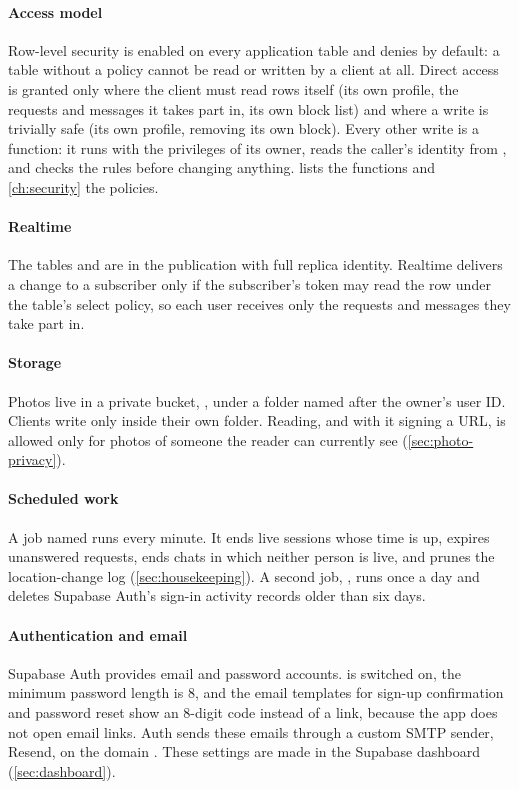 \paragraph{Access model} Row-level security is enabled on every application table and denies by default:
a table without a policy cannot be read or written by a client at all. Direct access is granted only
where the client must read rows itself (its own profile, the requests and messages it takes part in, its
own block list) and where a write is trivially safe (its own profile, removing its own block). Every
other write is a  function: it runs with the privileges of its owner, reads the
caller's identity from , and checks the rules before changing anything. 
lists the functions and \cref{ch:security} the policies.

\paragraph{Realtime} The tables  and  are in the
 publication with full replica identity. Realtime delivers a change to a
subscriber only if the subscriber's token may read the row under the table's select policy, so each user
receives only the requests and messages they take part in.

\paragraph{Storage} Photos live in a private bucket, , under a folder named after the
owner's user ID. Clients write only inside their own folder. Reading, and with it signing a URL, is
allowed only for photos of someone the reader can currently see (\cref{sec:photo-privacy}).

\paragraph{Scheduled work} A  job named  runs
 every minute. It ends live sessions whose time is up, expires unanswered
requests, ends chats in which neither person is live, and prunes the location-change log
(\cref{sec:housekeeping}). A second job, , runs 
once a day and deletes Supabase Auth's sign-in activity records older than six days.

\paragraph{Authentication and email} Supabase Auth provides email and password accounts.  is switched on, the minimum password length is 8, and the email templates for sign-up
confirmation and password reset show an 8-digit code instead of a link, because the app does not open
email links. Auth sends these emails through a custom SMTP sender, Resend, on the domain
. These settings are made in the Supabase dashboard (\cref{sec:dashboard}).

